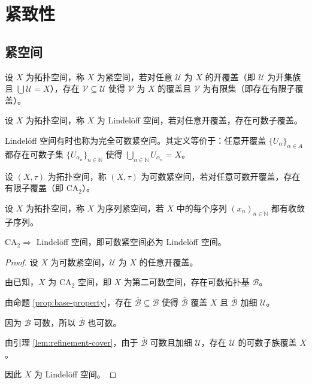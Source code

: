 \documentclass[lang=cn,a4paper,newtx,figureplace=section,tableplace=section]{elegantbook}
\begin{document}
\chapter{紧致性}

\section{紧空间}
\begin{definition}[紧空间]\label{def:compact-space}
设 $X$ 为拓扑空间，称 $X$ 为紧空间，若对任意 $\mathcal{U}$ 为 $X$ 的开覆盖（即 $\mathcal{U}$ 为开集族且 $\bigcup \mathcal{U} = X$），存在 $\mathcal{V} \subseteq \mathcal{U}$ 使得 $\mathcal{V}$ 为 $X$ 的覆盖且 $\mathcal{V}$ 为有限集（即存在有限子覆盖）。
\end{definition}

\begin{definition}[Lindelöff 空间]\label{def:lindeloff-space}
设 $X$ 为拓扑空间，称 $X$ 为 Lindelöff 空间，若对任意开覆盖，存在可数子覆盖。
\end{definition}

\begin{remark}
Lindelöff 空间有时也称为完全可数紧空间。其定义等价于：任意开覆盖 $\{U_\alpha\}_{\alpha \in A}$ 都存在可数子集 $\{U_{\alpha_n}\}_{n \in \mathbb{N}}$ 使得 $\bigcup_{n \in \mathbb{N}} U_{\alpha_n} = X$。
\end{remark}

\begin{definition}[可数紧空间]\label{def:countably-compact-space}
设 $(X,\tau)$ 为拓扑空间，称 $(X,\tau)$ 为可数紧空间，若对任意可数开覆盖，存在有限子覆盖（即 $\text{CA}_2$）。
\end{definition}

\begin{definition}[序列紧空间]\label{def:sequentially-compact-space}
设 $X$ 为拓扑空间，称 $X$ 为序列紧空间，若 $X$ 中的每个序列 $(x_n)_{n \in \mathbb{N}}$ 都有收敛子序列。
\end{definition}

\begin{proposition}\label{prop:CA2-implies-lindeloff}
$\text{CA}_2 \Rightarrow$ Lindelöff 空间，即可数紧空间必为 Lindelöff 空间。
\end{proposition}
\begin{proof}
设 $X$ 为可数紧空间，$\mathcal{U}$ 为 $X$ 的任意开覆盖。

由已知，$X$ 为 $\text{CA}_2$ 空间，即 $X$ 为第二可数空间，存在可数拓扑基 $\mathcal{B}$。

由命题 \ref{prop:base-property}，存在 $\overline{\mathcal{B}} \subseteq \mathcal{B}$ 使得 $\overline{\mathcal{B}}$ 覆盖 $X$ 且 $\overline{\mathcal{B}}$ 加细 $\mathcal{U}$。

因为 $\mathcal{B}$ 可数，所以 $\overline{\mathcal{B}}$ 也可数。

由引理 \ref{lem:refinement-cover}，由于 $\overline{\mathcal{B}}$ 可数且加细 $\mathcal{U}$，存在 $\mathcal{U}$ 的可数子族覆盖 $X$。

因此 $X$ 为 Lindelöff 空间。
\end{proof}
\end{document}
